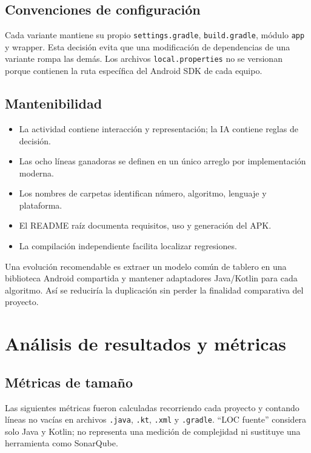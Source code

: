 \documentclass[stu,a4paper,12pt,floatsintext]{apa7}
\begin{document}
\subsection{Convenciones de configuración}
Cada variante mantiene su propio \texttt{settings.gradle},
\texttt{build.gradle}, módulo \texttt{app} y wrapper. Esta decisión evita que
una modificación de dependencias de una variante rompa las demás. Los archivos
\texttt{local.properties} no se versionan porque contienen la ruta específica
del Android SDK de cada equipo.

\subsection{Mantenibilidad}
\begin{itemize}
  \item La actividad contiene interacción y representación; la IA contiene
        reglas de decisión.
  \item Las ocho líneas ganadoras se definen en un único arreglo por
        implementación moderna.
  \item Los nombres de carpetas identifican número, algoritmo, lenguaje y
        plataforma.
  \item El README raíz documenta requisitos, uso y generación del APK.
  \item La compilación independiente facilita localizar regresiones.
\end{itemize}
Una evolución recomendable es extraer un modelo común de tablero en una
biblioteca Android compartida y mantener adaptadores Java/Kotlin para cada
algoritmo. Así se reduciría la duplicación sin perder la finalidad comparativa
del proyecto.

\section{Análisis de resultados y métricas}
\subsection{Métricas de tamaño}
Las siguientes métricas fueron calculadas recorriendo cada proyecto y contando
líneas no vacías en archivos \texttt{.java}, \texttt{.kt}, \texttt{.xml} y
\texttt{.gradle}. ``LOC fuente'' considera solo Java y Kotlin; no representa
una medición de complejidad ni sustituye una herramienta como SonarQube.
\end{document}
